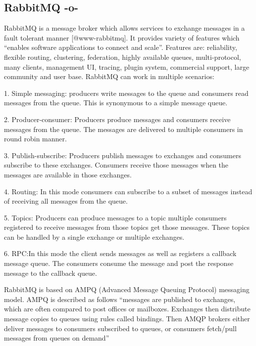\subsection{RabbitMQ   -o-}

RabbitMQ is a message broker which allows services to exchange
messages in a fault tolerant manner [@www-rabbitmq].  It provides
variety of features which ``enables software applications to connect
and scale''. Features are: reliability, flexible routing, clustering,
federation, highly available queues, multi-protocol, many clients,
management UI, tracing, plugin system, commercial support, large
community and user base. RabbitMQ can work in multiple scenarios:

     1. Simple messaging: producers write messages to the queue and
        consumers read messages from the queue. This is synonymous
        to a simple message queue.

     2. Producer-consumer: Producers produce messages and consumers
        receive messages from the queue. The messages are delivered to
        multiple consumers in round robin manner.

     3. Publish-subscribe: Producers publish messages to exchanges
        and consumers subscribe to these exchanges. Consumers receive
        those messages when the messages are available in those
        exchanges.

     4. Routing: In this mode consumers can subscribe to a subset
        of messages instead of receiving all messages from the queue.

     5. Topics: Producers can produce messages to a topic multiple
        consumers registered to receive messages from those topics get
        those messages. These topics can be handled by a single
        exchange or multiple exchanges.

     6. RPC:In this mode the client sends messages as well as
        registers a callback message queue. The consumers consume the
        message and post the response message to the callback queue.

        RabbitMQ is based on AMPQ (Advanced
        Message Queuing Protocol) messaging model\cite{ampq-article}.
        AMPQ is described
        as follows ``messages are published to exchanges, which are
        often compared to post offices or mailboxes. Exchanges then
        distribute message copies to queues using rules called
        bindings. Then AMQP brokers either deliver messages to
        consumers subscribed to queues, or consumers fetch/pull
        messages from queues on demand''



